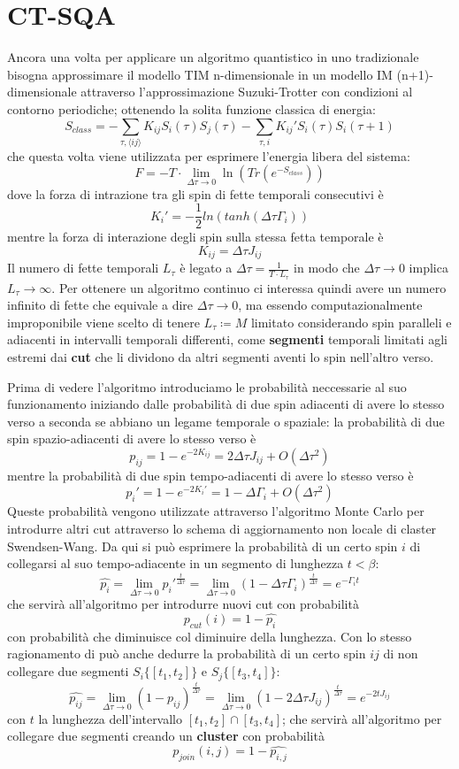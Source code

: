 \section{CT-SQA}
Ancora una volta per applicare un algoritmo quantistico in uno tradizionale bisogna approssimare il modello TIM n-dimensionale in un modello IM (n+1)-dimensionale attraverso l'approssimazione Suzuki-Trotter con condizioni al contorno periodiche; ottenendo la solita funzione classica di energia:
$$S_{class} = - \sum_{\tau,\langle ij \rangle} K_{ij} S_i(\tau) S_j(\tau) - \sum_{\tau, i} K_{ij}' S_i(\tau) S_i(\tau+1)$$
che questa volta viene utilizzata per esprimere l'energia libera del sistema:
$$F = - T \cdot \lim_{\Delta \tau \to 0} \ln(Tr(e^{-S_{class}}))$$
dove la forza di intrazione tra gli spin di fette temporali consecutivi è
$$K_{i}' = - \frac{1}{2} ln( tanh( \Delta \tau \Gamma_i) )$$
mentre la forza di interazione degli spin sulla stessa fetta temporale è
$$K_{ij} = \Delta \tau J_{ij}$$
Il numero di fette temporali $L_{\tau}$ è legato a $\Delta \tau = \frac{1}{T \cdot L_{\tau}}$ in modo che $\Delta \tau \to 0$ implica $L_{\tau} \to \infty$.
Per ottenere un algoritmo continuo ci interessa quindi avere un numero infinito di fette che equivale a dire $\Delta \tau \to 0$, ma essendo computazionalmente improponibile viene scelto di tenere $L_{\tau} \coloneqq M$ limitato considerando spin paralleli e adiacenti in intervalli temporali differenti, come \textbf{segmenti} temporali limitati agli estremi dai \textbf{cut} che li dividono da altri segmenti aventi lo spin nell'altro verso.

Prima di vedere l'algoritmo introduciamo le probabilità neccessarie al suo funzionamento iniziando dalle probabilità di due spin adiacenti di avere lo stesso verso a seconda se abbiano un legame temporale o spaziale:
la probabilità di due spin spazio-adiacenti di avere lo stesso verso è
$$p_{ij} = 1 - e^{-2K_{ij}} = 2\Delta \tau J_{ij} + O(\Delta \tau^2)$$
mentre la probabilità di due spin tempo-adiacenti di avere lo stesso verso è
$$p_i' = 1 - e^{-2K_{i}'} = 1 - \Delta \Gamma_{i} + O(\Delta \tau^2)$$
Queste probabilità vengono utilizzate attraverso l'algoritmo Monte Carlo per introdurre altri cut attraverso lo schema di aggiornamento non locale di claster Swendsen-Wang.
Da qui si può esprimere la probabilità di un certo spin $i$ di collegarsi al suo tempo-adiacente in un segmento di lunghezza $t < \beta$:
$$\hat{p_i} = \lim_{\Delta \tau \to 0} p_i'^{\frac{t}{\Delta \tau}} = \lim_{\Delta \tau \to 0} (1 - \Delta \tau \Gamma_i)^\frac{t}{\Delta \tau} = e^{- \Gamma_i t}$$
che servirà all'algoritmo per introdurre nuovi cut con probabilità
$$p_{cut}(i) = 1 - \hat{p_i}$$
con probabilità che diminuisce col diminuire della lunghezza.
Con lo stesso ragionamento di può anche dedurre la probabilità di un certo spin $ij$ di non collegare due segmenti $S_i\{[t_1, t_2]\}$ e $S_j\{[t_3, t_4]\}$:
$$\hat{p_{ij}} = \lim_{\Delta \tau \to 0} (1 - p_{ij})^\frac{t}{\Delta \tau} = \lim_{\Delta \tau \to 0} (1 - 2\Delta \tau J_{ij})^\frac{t}{\Delta \tau} = e^{-2 t J_{ij}}$$
con $t$ la lunghezza dell'intervallo $[t_1, t_2] \cap [t_3, t_4]$; che servirà all'algoritmo per collegare due segmenti creando un \textbf{cluster} con probabilità
$$p_{join}(i,j) = 1 - \hat{p_{i,j}}$$

